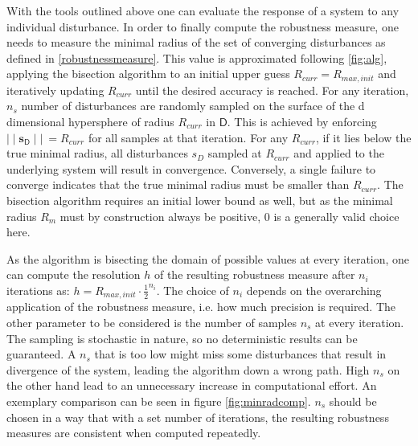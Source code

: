 
    With the tools outlined above one can evaluate the response of a system to any individual disturbance. In order to finally compute the robustness measure, one needs to measure the minimal radius of the set of converging disturbances as defined in \ref{robustnessmeasure}. This value is approximated following \ref{fig:alg}, applying the bisection algorithm to an initial upper guess $R_{curr} =  R_{max,init}$ and iteratively updating $R_{curr}$ until the desired accuracy is reached. For any iteration, $n_{s}$ number of disturbances are randomly sampled on the surface of the d dimensional hypersphere of radius $R_{curr}$ in $\mathsf{D}$. This is achieved by enforcing $\mid\mid \mathbf{s}_{\mathsf{D}}\mid\mid\ = R_{curr}$ for all samples at that iteration. For any $R_{curr}$, if it lies below the true minimal radius, all disturbances ${s_D}$ sampled at $R_{curr}$ and applied to the underlying system will result in convergence. Conversely, a single failure to converge indicates that the true minimal radius must be smaller than $R_{curr}$. The bisection algorithm requires an initial lower bound as well, but as the minimal radius $R_m$ must by construction always be positive, 0 is a generally valid choice here. 

    As the algorithm is bisecting the domain of possible values at every iteration, one can compute the resolution $h$ of the resulting robustness measure after $n_i$ iterations as: $h = R_{max,init}\cdot\frac{1}{2}^{n_i}$. The choice of $n_i$ depends on the overarching application of the robustness measure, i.e. how much precision is required. The other parameter to be considered is the number of samples $n_{s}$ at every iteration. The sampling is stochastic in nature, so no deterministic results can be guaranteed. A $n_{s}$ that is too low might miss some disturbances that result in divergence of the system, leading the algorithm down a wrong path. High $n_{s}$ on the other hand lead to an unnecessary increase in computational effort. An exemplary comparison can be seen in figure \ref{fig:minradcomp}. 
    $n_{s}$ should be chosen in a way that with a set number of iterations, the resulting robustness measures are consistent when computed repeatedly. 

